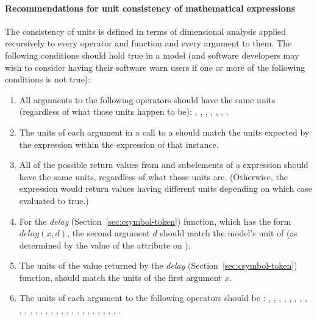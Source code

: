 \paragraph{Recommendations for unit consistency of mathematical expressions}

The consistency of units is defined in terms of dimensional
analysis applied recursively to every operator and function and
every argument to them.  The following conditions should hold true
in a model (and software developers may wish to consider having
their software warn users if one or more of the following
conditions is not true):

\begin{enumerate}

\item All arguments to the following operators should have the same
  units (regardless of what those units happen to be):
  , , ,  ,
  , , .

\item The units of each argument in a call to a
  \FunctionDefinition should match the units expected by the
   expression within the  expression of
  that \FunctionDefinition instance.


\item All of the possible return values from  and
   subelements of a  expression
  should have the same units, regardless of what those units are.
  (Otherwise, the  expression would return values
  having different units depending on which case evaluated to
  true.)

\item For the \emph{delay} 
  (Section~\ref{sec:csymbol-token}) function, which has the form
  $delay(x, d)$, the second argument $d$ should match the model's
  unit of  (as determined by the value of the
   attribute on \Model).

\item The units of the value returned by the \emph{delay} 
  (Section~\ref{sec:csymbol-token}) function, should match the units of the
  first argument $x$.

\item The units of each argument to the following operators should
  be : , , ,
  , , , ,
  , , , ,
  , , , ,
  , , , ,
  , , , ,
  , , ,
  , .


\end{enumerate}
